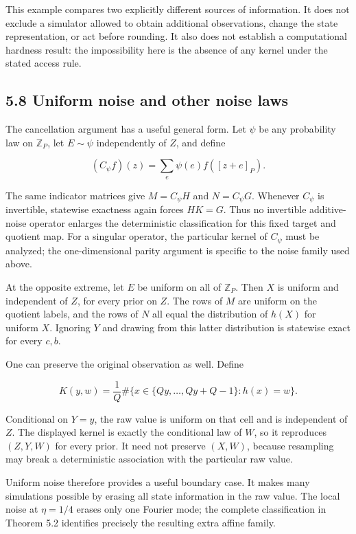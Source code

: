 \documentclass[
]{article}
\begin{document}
This example compares two explicitly different sources of information.
It does not exclude a simulator allowed to obtain additional
observations, change the state representation, or act before rounding.
It also does not establish a computational hardness result: the
impossibility here is the absence of any kernel under the stated access
rule.

\subsection{5.8 Uniform noise and other noise
laws}\label{uniform-noise-and-other-noise-laws}

The cancellation argument has a useful general form. Let \(\psi\) be any
probability law on \(\mathbb Z_P\), let \(E\sim\psi\) independently of
\(Z\), and define

\[
(C_\psi f)(z)=\sum_e\psi(e)f([z+e]_P).
\]

The same indicator matrices give \(M=C_\psi H\) and \(N=C_\psi G\).
Whenever \(C_\psi\) is invertible, statewise exactness again forces
\(HK=G\). Thus no invertible additive-noise operator enlarges the
deterministic classification for this fixed target and quotient map. For
a singular operator, the particular kernel of \(C_\psi\) must be
analyzed; the one-dimensional parity argument is specific to the noise
family used above.

At the opposite extreme, let \(E\) be uniform on all of \(\mathbb Z_P\).
Then \(X\) is uniform and independent of \(Z\), for every prior on
\(Z\). The rows of \(M\) are uniform on the quotient labels, and the
rows of \(N\) all equal the distribution of \(h(X)\) for uniform \(X\).
Ignoring \(Y\) and drawing from this latter distribution is statewise
exact for every \(c,b\).

One can preserve the original observation as well. Define

\[
K(y,w)=\frac1Q\#\{x\in\{Qy,\ldots,Qy+Q-1\}:h(x)=w\}.
\]

Conditional on \(Y=y\), the raw value is uniform on that cell and is
independent of \(Z\). The displayed kernel is exactly the conditional
law of \(W\), so it reproduces \((Z,Y,W)\) for every prior. It need not
preserve \((X,W)\), because resampling may break a deterministic
association with the particular raw value.

Uniform noise therefore provides a useful boundary case. It makes many
simulations possible by erasing all state information in the raw value.
The local noise at \(\eta=1/4\) erases only one Fourier mode; the
complete classification in Theorem 5.2 identifies precisely the
resulting extra affine family.
\end{document}
